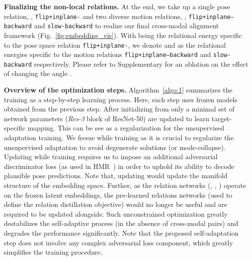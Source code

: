 \documentclass{article}
\begin{document}
\textbf{Finalizing the non-local relations.} At the end, we take up a single pose relation, \ie, \texttt{flip+inplane-} and two diverse motion relations, \ie, \texttt{flip+inplane--backward} and \texttt{slow-backward} to realize our final cross-modal alignment framework (Fig.~\ref{fig:embedding_vis}). With  being the relational energy specific to the pose space relation \texttt{\texttt{flip+inplane-}}, we denote  and  as the relational energies specific to the motion relations \texttt{flip+inplane--backward} and \texttt{slow-backward} respectively. Please refer to Supplementary for an ablation on the effect of changing the angle .


\textbf{Overview of the optimization steps.} Algorithm~\ref{algo:1} summarizes the training as a step-by-step learning process. Here, each step uses frozen models obtained from the previous step. After initializing  from  only a minimal set of network parameters (\textit{Res-3} block of ResNet-50) are updated to learn target-specific mapping. This can be see as a regularization for the unsupervised adaptation training. 
We freeze  while training  as it is crucial to regularize the unsupervised adaptation to avoid degenerate solutions (or mode-collapse). Updating  while training  requires us to impose an additional adversarial discriminator loss (as used in HMR~\cite{kanazawa2018end}) in order to uphold its ability to decode plausible pose predictions. Note that, updating  would update the manifold structure of the embedding space. Further, as the relation networks (, , ) operate on the frozen latent embeddings, the pre-learned relations networks (used to define the relation distillation objective) would no longer be useful and are required to be updated alongside. Such unconstrained optimization greatly destabilizes the self-adaptive process (in the absence of cross-modal pairs) and degrades the performance significantly. Note that the proposed self-adaptation step does not involve any complex adversarial loss component, which greatly simplifies the training procedure.
\end{document}

